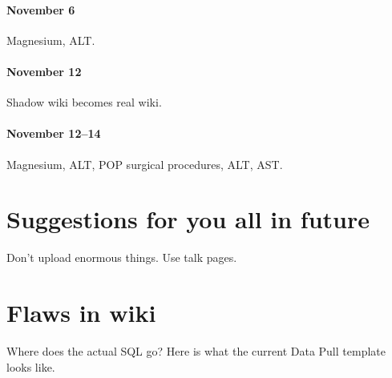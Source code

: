 \documentclass{tufte-handout}
\begin{document}
\paragraph{November 6} Magnesium, ALT.

\paragraph{November 12} Shadow wiki becomes real wiki.

\paragraph{November 12--14} Magnesium, ALT, POP surgical procedures,
ALT, AST.

\section{Suggestions for you all in future}

Don't upload enormous things. Use talk pages. 

\section{Flaws in wiki}

Where does the actual SQL go? Here is what the current Data Pull
template looks like.
\end{document}
